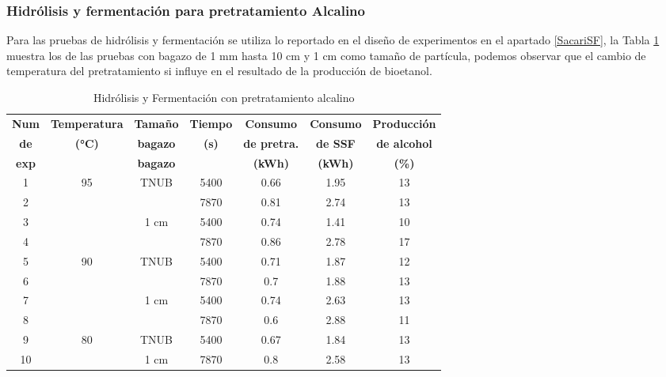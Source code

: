 \documentclass[12pt]{article}
\begin{document}
		\subsubsection{ Hidrólisis y fermentación para pretratamiento Alcalino}
		
		Para las pruebas de hidrólisis y fermentación se utiliza lo reportado en el diseño de experimentos en el apartado \ref{SacariSF}, la Tabla \ref{ssf con Pretratamiento Alcalino}  muestra los de las pruebas con bagazo de 1 mm hasta 10 cm y 1 cm como tamaño de partícula, podemos observar que el cambio de temperatura del pretratamiento si influye en el resultado de la producción de bioetanol.
		
		
		\begin{table}[H]
			\centering
			\caption{Hidrólisis y Fermentación con pretratamiento alcalino}
			\begin{tabular}{|c|c|c|c|c|c|c|}
				\hline
				\textbf{Num} & \textbf{Temperatura} & \textbf{Tamaño} & \textbf{Tiempo} & \textbf{Consumo } & \textbf{Consumo } & \textbf{Producción } \\
			\textbf{de}	&\textbf{ (°C)}& \textbf{bagazo}&\textbf{(s)}	&\textbf{de pretra. }&\textbf{ de SSF}&\textbf{ de alcohol}\\ 
				\textbf{exp}	& & \textbf{bagazo}&	&\textbf{ (kWh)}&\textbf{ (kWh)}&\textbf{ (\%)}\\ \hline
			
			
				1 & \multirow{4}{*}{95} & \multirow{2}{*}{TNUB} & 5400 &0.66& 1.95 & 13 \\ \cline{1-1} \cline{4-6}
				2 &                     &                       & 7870 &0.81& 2.74 & 13 \\ \cline{3-6}  \cline{1-1}
				3 &                     &\multirow{2}{*}{1 cm}  & 5400 &0.74& 1.41 & 10 \\ \cline{4-6}  \cline{1-1}
				4 &                     &                       & 7870 &0.86& 2.78 & 17 \\ \hline
				5 & \multirow{4}{*}{90} & \multirow{2}{*}{TNUB} & 5400 &0.71& 1.87 & 12 \\  \cline{1-1} \cline{4-6}
				6 &                     &                       & 7870 &0.7& 1.88 & 13 \\ \cline{1-1} \cline{3-6}
				7 &                     & \multirow{2}{*}{1 cm} & 5400 &0.74& 2.63 & 13 \\ \cline{1-1} \cline{4-6}
				8 &                     &                       & 7870 & 0.6&2.88 & 11 \\ \hline
				9 &\multirow{2}{*}{80 } & TNUB                  & 5400 &0.67 &1.84 & 13 \\ \cline{1-1} \cline{3-6}
				10 &                     & 1 cm                 & 7870 & 0.8&2.58 & 13 \\ \hline
			\end{tabular}
			\label{ssf con Pretratamiento Alcalino}
		\end{table}
		
\end{document}
